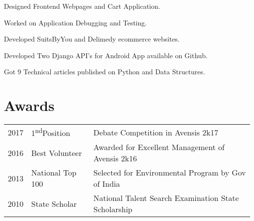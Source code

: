 \documentclass[]{deedy-resume-openfont}
\begin{document}
\begin{minipage}[t]{0.66\textwidth}
\begin{tightemize}
\item Designed Frontend Webpages and Cart Application.\item Worked on Application Debugging and Testing.\end{tightemize}
\sectionsep

\begin{tightemize}
\item Developed SuitsByYou and Delimedy ecommerce websites.\item Developed Two Django API's for Android App available on Github.\end{tightemize}
\sectionsep

\begin{tightemize}
\item Got 9 Technical articles published on Python and Data Structures. \end{tightemize}
\sectionsep





\section{Awards} 
\begin{tabular}{rll}
2017	     & 1\textsuperscript{nd}Position &Debate Competition in Avensis 2k17\\
2016	     & Best Volunteer  &Awarded for Excellent Management of Avensis 2k16\\
2013	     & National Top 100  &Selected for Environmental Program by Gov of India\\
2010	     & State Scholar  &National Talent Search Examination State Scholarship\\
\end{tabular}
\sectionsep


\end{minipage}
\end{document}

